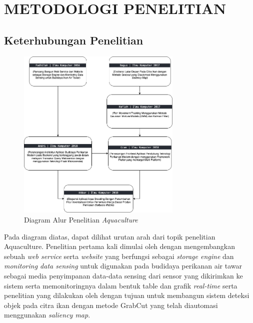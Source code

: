 
\chapter{METODOLOGI PENELITIAN}

\begin{spacing}{1.5}

\section{Keterhubungan Penelitian}

\begin{figure}[H]
	\centering
	\includegraphics[width=0.7\textwidth]{gambar/research_tree.png}
	\caption{Diagram Alur Penelitian \textit{Aquaculture}}
\end{figure}

Pada diagram diatas, dapat dilihat urutan arah dari topik penelitian Aquaculture. Penelitian pertama kali dimulai oleh \citep{fadhil2021} dengan mengembangkan sebuah \textit{web service} serta \textit{website} yang berfungsi sebagai \textit{storage engine} dan \textit{monitoring data sensing} untuk digunakan pada budidaya perikanan air tawar sebagai media penyimpanan data-data sensing dari sensor yang dikirimkan ke sistem serta memonitoringnya dalam bentuk table dan grafik \textit{real-time} serta penelitian yang dilakukan oleh \citep{bagus2022} dengan tujuan untuk membangun sistem deteksi objek pada citra ikan dengan metode GrabCut yang telah diautomasi menggunakan \textit{saliency map}.


\end{spacing}
